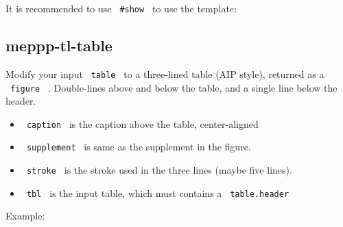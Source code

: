 It is recommended to use \texttt{\ \#show\ } to use the template:

\begin{Shaded}
\begin{Highlighting}[]
\NormalTok{)}
\end{Highlighting}
\end{Shaded}

\subsection{meppp-tl-table}\label{meppp-tl-table}

Modify your input \texttt{\ table\ } to a three-lined table (AIP style),
returned as a \texttt{\ figure\ } . Double-lines above and below the
table, and a single line below the header.

\begin{Shaded}
\begin{Highlighting}[]
\end{Highlighting}
\end{Shaded}

\begin{itemize}
\tightlist
\item
  \texttt{\ caption\ } is the caption above the table, center-aligned
\item
  \texttt{\ supplement\ } is same as the supplement in the figure.
\item
  \texttt{\ stroke\ } is the stroke used in the three lines (maybe five
  lines).
\item
  \texttt{\ tbl\ } is the input table, which must contains a
  \texttt{\ table.header\ }
\end{itemize}

Example:

\begin{Shaded}
\begin{Highlighting}[]
\NormalTok{    [Data1], [Data2], [Data3], [Data4],}
\NormalTok{  )}
\NormalTok{)}
\end{Highlighting}
\end{Shaded}

